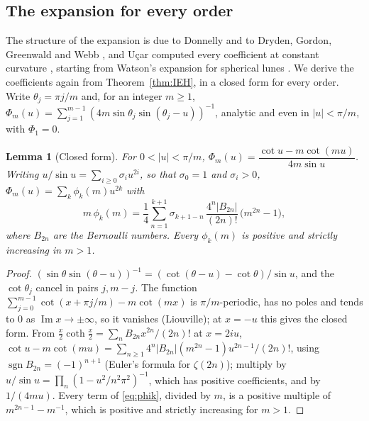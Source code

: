 \documentclass[pdflatex,sn-mathphys-num]{sn-jnl}
\theoremstyle{thmstyleone}%
\newtheorem{lemma}[theorem]{Lemma}%
\theoremstyle{thmstylethree}%
\begin{document}
\subsection{The expansion for every order}\label{sec:heatexp}

The structure of the expansion is due to Donnelly and to Dryden, Gordon, Greenwald and Webb \cite{donnelly1976,donnelly1979,dggw2008}, and U\c{c}ar computed every coefficient at constant curvature \cite{ucar2017}, starting from Watson's expansion for spherical lunes \cite{watson2005}. We derive the coefficients again from Theorem~\ref{thm:IEH}, in a closed form for every order. Write $\theta_j=\pi j/m$ and, for an integer $m\ge1$, $\Phi_m(u)=\sum_{j=1}^{m-1}(4m\sin\theta_j\sin(\theta_j-u))^{-1}$, analytic and even in $|u|<\pi/m$, with $\Phi_1=0$.

\begin{lemma}[Closed form]\label{lem:Phi}
For $0<|u|<\pi/m$, $\Phi_m(u)=\dfrac{\cot u-m\cot(mu)}{4m\sin u}$. Writing $u/\sin u=\sum_{i\ge0}\sigma_iu^{2i}$, so that $\sigma_0=1$ and $\sigma_i>0$, $\Phi_m(u)=\sum_k\phi_k(m)u^{2k}$ with
\begin{equation}\label{eq:phik}
  m\,\phi_k(m)=\frac14\sum_{n=1}^{k+1}\sigma_{k+1-n}\,\frac{4^n|B_{2n}|}{(2n)!}\,\big(m^{2n}-1\big),
\end{equation}
where $B_{2n}$ are the Bernoulli numbers. Every $\phi_k(m)$ is positive and strictly increasing in $m>1$.
\end{lemma}

\begin{proof}
$(\sin\theta\sin(\theta-u))^{-1}=(\cot(\theta-u)-\cot\theta)/\sin u$, and the $\cot\theta_j$ cancel in pairs $j,m-j$. The function $\sum_{j=0}^{m-1}\cot(x+\pi j/m)-m\cot(mx)$ is $\pi/m$-periodic, has no poles and tends to $0$ as $\operatorname{Im}x\to\pm\infty$, so it vanishes (Liouville); at $x=-u$ this gives the closed form. From $\frac x2\coth\frac x2=\sum_nB_{2n}x^{2n}/(2n)!$ at $x=2iu$, $\cot u-m\cot(mu)=\sum_{n\ge1}4^n|B_{2n}|(m^{2n}-1)u^{2n-1}/(2n)!$, using $\operatorname{sgn}B_{2n}=(-1)^{n+1}$ (Euler's formula for $\zeta(2n)$); multiply by $u/\sin u=\prod_n(1-u^2/n^2\pi^2)^{-1}$, which has positive coefficients, and by $1/(4mu)$. Every term of \eqref{eq:phik}, divided by $m$, is a positive multiple of $m^{2n-1}-m^{-1}$, which is positive and strictly increasing for $m>1$.
\end{proof}
\end{document}
